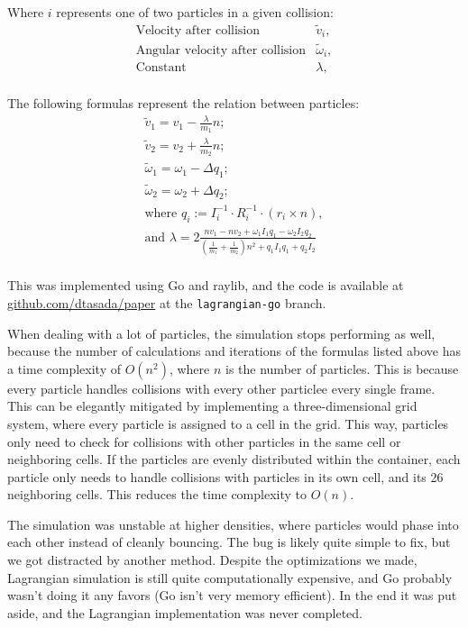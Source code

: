 \documentclass[a4paper,12pt,titlepage]{article}
\begin{document}
Where $i$ represents one of two particles in a given collision:
\[
\begin{array}{ll}
	\text{Velocity after collision} & \tilde{v}_i, \\ 
	\text{Angular velocity after collision} & \tilde{\omega}_i, \\
	\text{Constant} & \lambda, \\
\end{array}
\]

The following formulas represent the relation between particles:
\[
\begin{array}{cc}
	\tilde{v}_1 = v_1 - \frac{\lambda}{m_1} n; \\ 
	\tilde{v}_2 = v_2 + \frac{\lambda}{m_2} n; \\
	\tilde{\omega}_1 = \omega_1 - \Delta q_1; \\
	\tilde{\omega}_2 = \omega_2 + \Delta q_2; \\

	\text{where } q_i := I_i^{-1} \cdot R_i^{-1} \cdot (r_i\times n), \\
	\text{and } \lambda = 2 \frac{n v_1 - n v_2 + \omega_1 I_1 q_1 - \omega_2 I_2 q_2}
	{(\frac{1}{m_1} + \frac{1}{m_2})n^2 + q_1 I_1 q_1 + q_2 I_2} \\
\end{array}
\]

This was implemented using Go and raylib, and the code is available at
\href{www.github.com/dtasada/paper}{github.com/dtasada/paper} at the \lstinline{lagrangian-go} branch.

When dealing with a lot of particles, the simulation stops performing as well,
because the number of calculations and iterations of the formulas listed above
has a time complexity of $O(n^2)$, where $n$ is the number of particles. This is
because every particle handles collisions with every other particlee every
single frame. This can be elegantly mitigated by implementing a three-dimensional
grid system, where every particle is assigned to a cell in the grid. This way,
particles only need to check for collisions with other particles in the same cell
or neighboring cells. If the particles are evenly distributed within the container,
each particle only needs to handle collisions with particles in its own cell, and
its 26 neighboring cells. This reduces the time complexity to $O(n)$.

The simulation was unstable at higher densities, where particles would phase
into each other instead of cleanly bouncing. The bug is likely quite simple to
fix, but we got distracted by another method. Despite the optimizations we
made, Lagrangian simulation is still quite computationally expensive, and Go
probably wasn't doing it any favors (Go isn't very memory efficient). In the
end it was put aside, and the Lagrangian implementation was never completed.
\end{document}
